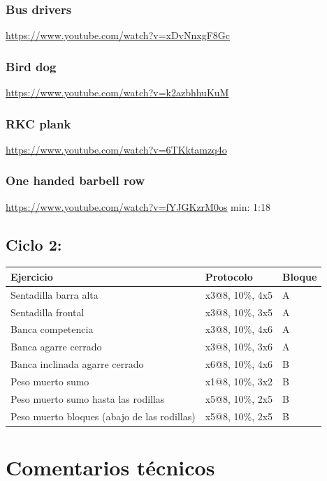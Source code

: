 \documentclass[11pt]{article}
\begin{document}
\subsubsection{Bus drivers}
\label{sec:org05d7f4a}
\url{https://www.youtube.com/watch?v=xDvNnxgF8Gc}
\subsubsection{Bird dog}
\label{sec:orga85ddb1}
\url{https://www.youtube.com/watch?v=k2azbhhuKuM}
\subsubsection{RKC plank}
\label{sec:orgaabc84c}
\url{https://www.youtube.com/watch?v=6TKktamzq4o}
\subsubsection{One handed barbell row}
\label{sec:org43a1f2c}
\url{https://www.youtube.com/watch?v=fYJGKzrM0os} min: 1:18

\subsection{Ciclo 2:}
\label{sec:org972bf19}
\begin{center}
\begin{tabular}{lll}
Ejercicio & Protocolo & Bloque\\
\hline
Sentadilla barra alta & x3@8, 10\%, 4x5 & A\\
Sentadilla frontal & x3@8, 10\%, 3x5 & A\\
Banca competencia & x3@8, 10\%, 4x6 & A\\
Banca agarre cerrado & x3@8, 10\%, 3x6 & A\\
\hline
Banca inclinada agarre cerrado & x6@8, 10\%, 4x6 & B\\
Peso muerto sumo & x1@8, 10\%, 3x2 & B\\
Peso muerto sumo hasta las rodillas & x5@8, 10\%, 2x5 & B\\
Peso muerto bloques (abajo de las rodillas) & x5@8, 10\%, 2x5 & B\\
\hline
\end{tabular}
\end{center}
\section{Comentarios técnicos}
\label{sec:orge95c279}
\end{document}
